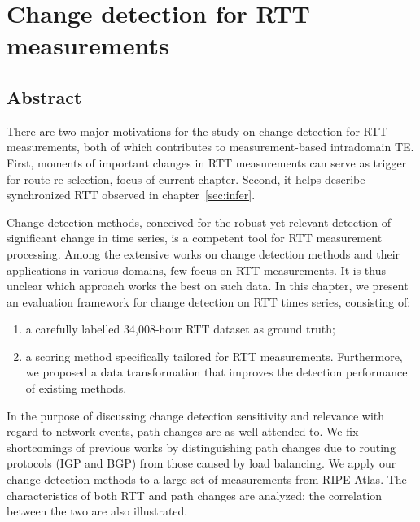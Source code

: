 \chapter{Change detection for RTT measurements}
\label{sec:cpt_rtt}

\section*{Abstract}
There are two major motivations for the study on change detection for \ac{RTT} measurements, both of which contributes to measurement-based intradomain \ac{TE}.
First, moments of important changes in RTT measurements can serve as trigger for route re-selection, focus of current chapter.
Second, it helps describe synchronized RTT observed in chapter~\ref{sec:infer}.


Change detection methods, conceived for the robust yet relevant detection of significant change in time series, is a competent tool for RTT measurement processing.
Among the extensive works on change detection methods and their applications in various domains, few focus on RTT measurements. It is thus unclear which approach works the best on such data.  
In this chapter, we present an evaluation framework for change detection on RTT times series, consisting of:
\begin{enumerate}
	\item a carefully labelled 34,008-hour RTT dataset as ground truth;
	\item a scoring method specifically tailored for RTT measurements.
Furthermore, we proposed a data transformation that improves the detection performance of existing methods.
\end{enumerate}

In the purpose of discussing change detection sensitivity and relevance with regard to network events, path changes are as well attended to. 
We fix shortcomings of previous works by distinguishing path changes due to routing protocols (IGP and BGP) from those caused by load balancing. 
We apply our change detection methods to a large set of measurements from RIPE Atlas. 
The characteristics of both RTT and path changes are analyzed; the correlation between the two are also illustrated. 
\clearpage


